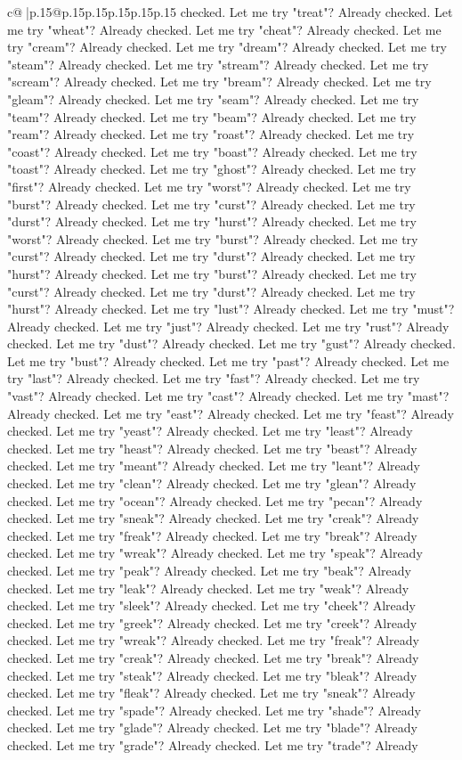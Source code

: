 \documentclass{article}
\begin{document}
{\begin{supertabular}{c@{$\;$}|p{.15\linewidth}@{}p{.15\linewidth}p{.15\linewidth}p{.15\linewidth}p{.15\linewidth}p{.15\linewidth}}
{{{checked. Let me try "treat"? Already checked. Let me try "wheat"? Already checked. Let me try "cheat"? Already checked. Let me try "cream"? Already checked. Let me try "dream"? Already checked. Let me try "steam"? Already checked. Let me try "stream"? Already checked. Let me try "scream"? Already checked. Let me try "bream"? Already checked. Let me try "gleam"? Already checked. Let me try "seam"? Already checked. Let me try "team"? Already checked. Let me try "beam"? Already checked. Let me try "ream"? Already checked. Let me try "roast"? Already checked. Let me try "coast"? Already checked. Let me try "boast"? Already checked. Let me try "toast"? Already checked. Let me try "ghost"? Already checked. Let me try "first"? Already checked. Let me try "worst"? Already checked. Let me try "burst"? Already checked. Let me try "curst"? Already checked. Let me try "durst"? Already checked. Let me try "hurst"? Already checked. Let me try "worst"? Already checked. Let me try "burst"? Already checked. Let me try "curst"? Already checked. Let me try "durst"? Already checked. Let me try "hurst"? Already checked. Let me try "burst"? Already checked. Let me try "curst"? Already checked. Let me try "durst"? Already checked. Let me try "hurst"? Already checked. Let me try "lust"? Already checked. Let me try "must"? Already checked. Let me try "just"? Already checked. Let me try "rust"? Already checked. Let me try "dust"? Already checked. Let me try "gust"? Already checked. Let me try "bust"? Already checked. Let me try "past"? Already checked. Let me try "last"? Already checked. Let me try "fast"? Already checked. Let me try "vast"? Already checked. Let me try "cast"? Already checked. Let me try "mast"? Already checked. Let me try "east"? Already checked. Let me try "feast"? Already checked. Let me try "yeast"? Already checked. Let me try "least"? Already checked. Let me try "heast"? Already checked. Let me try "beast"? Already checked. Let me try "meant"? Already checked. Let me try "leant"? Already checked. Let me try "clean"? Already checked. Let me try "glean"? Already checked. Let me try "ocean"? Already checked. Let me try "pecan"? Already checked. Let me try "sneak"? Already checked. Let me try "creak"? Already checked. Let me try "freak"? Already checked. Let me try "break"? Already checked. Let me try "wreak"? Already checked. Let me try "speak"? Already checked. Let me try "peak"? Already checked. Let me try "beak"? Already checked. Let me try "leak"? Already checked. Let me try "weak"? Already checked. Let me try "sleek"? Already checked. Let me try "cheek"? Already checked. Let me try "greek"? Already checked. Let me try "creek"? Already checked. Let me try "wreak"? Already checked. Let me try "freak"? Already checked. Let me try "creak"? Already checked. Let me try "break"? Already checked. Let me try "steak"? Already checked. Let me try "bleak"? Already checked. Let me try "fleak"? Already checked. Let me try "sneak"? Already checked. Let me try "spade"? Already checked. Let me try "shade"? Already checked. Let me try "glade"? Already checked. Let me try "blade"? Already checked. Let me try "grade"? Already checked. Let me try "trade"? Already }}}
\end{supertabular}}
\end{document}
